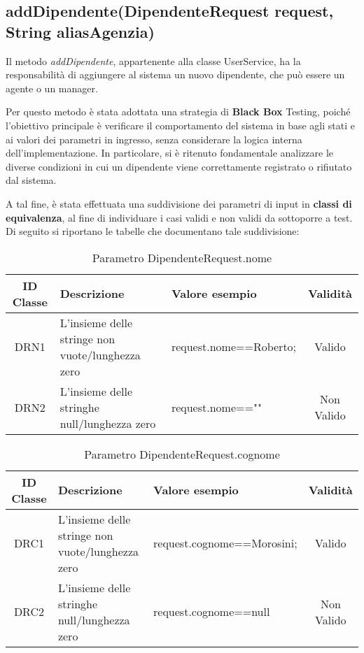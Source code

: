 \subsection{addDipendente(DipendenteRequest request, String aliasAgenzia)}

Il metodo \textit{addDipendente}, appartenente alla classe UserService, ha la responsabilità di aggiungere al sistema un nuovo dipendente, che può essere un agente o un manager.

Per questo metodo è stata adottata una strategia di\textbf{ Black Box} Testing, poiché l’obiettivo principale è verificare il comportamento del sistema in base agli stati e ai valori dei parametri in ingresso, senza considerare la logica interna dell’implementazione. In particolare, si è ritenuto fondamentale analizzare le diverse condizioni in cui un dipendente viene correttamente registrato o rifiutato dal sistema.

A tal fine, è stata effettuata una suddivisione dei parametri di input in \textbf{classi di equivalenza}, al fine di individuare i casi validi e non validi da sottoporre a test. Di seguito si riportano le tabelle che documentano tale suddivisione:

\begin{table}[H]
	\centering
	\begin{tabular}{|c|p{4cm}|p{5cm}|c|} 
		\hline
		\textbf{ID Classe} & \textbf{Descrizione} & \textbf{Valore esempio} & \textbf{Validità} \\
		\hline
		DRN1 & L'insieme delle stringe non vuote/lunghezza zero
		& request.nome==Roberto; & Valido \\
		\hline
		DRN2 & L'insieme delle stringhe null/lunghezza zero
		& request.nome=="" & Non Valido \\
		\hline
	\end{tabular}
	\caption{Parametro DipendenteRequest.nome}
	\label{tab:placeholder}
\end{table}

\begin{table}[H]
	\centering
	\begin{tabular}{|c|p{4cm}|p{5cm}|c|} 
		\hline
		\textbf{ID Classe} & \textbf{Descrizione} & \textbf{Valore esempio} & \textbf{Validità} \\
		\hline
		DRC1 & L'insieme delle stringe non vuote/lunghezza zero
		& request.cognome==Morosini; & Valido \\
		\hline
		DRC2 & L'insieme delle stringhe null/lunghezza zero
		& request.cognome==null & Non Valido \\
		\hline
	\end{tabular}
	\caption{Parametro DipendenteRequest.cognome}
	\label{tab:placeholder}
\end{table}

